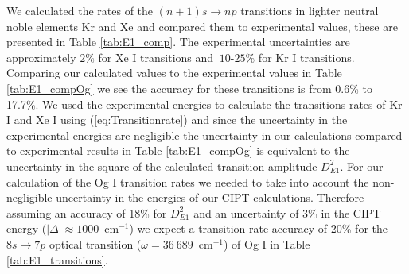 \documentclass[10pt,a4paper, twoside, openright]{report}
\begin{document}
We calculated the  rates of the $(n+1)s \rightarrow np$ transitions in lighter neutral noble elements Kr and Xe  and compared them to experimental values, these are presented in Table \ref{tab:E1_comp}. The experimental uncertainties are approximately $2\%$ for Xe I transitions \cite{Morton2000} and $~10$-$25\%$ for Kr I transitions\cite{Fuhr1996}. Comparing our calculated values to the experimental values in Table \ref{tab:E1_compOg} we see the accuracy for these transitions is from 0.6\% to 17.7\%. We used the experimental energies to calculate the transitions rates of Kr I and Xe I using (\ref{eq:Transitionrate}) and since the uncertainty in the experimental energies are negligible the uncertainty in our calculations compared to experimental results in Table \ref{tab:E1_compOg} is equivalent to the uncertainty in the square of the calculated transition amplitude $D_{E1}^2$. For our calculation of the Og I transition rates we needed to take into account the non-negligible uncertainty in the energies of our CIPT calculations.  Therefore assuming an accuracy of 18\% for $D_{E1}^2$ and an uncertainty of 3\% in the CIPT energy ($\left|\Delta\right| \approx 1000$~cm$^{-1}$) we expect a transition rate accuracy of 20\% for the $8s \rightarrow 7p$ optical transition ($\omega = 36~689$~cm$^{-1}$) of Og I in Table \ref{tab:E1_transitions}.  \\
\end{document}
